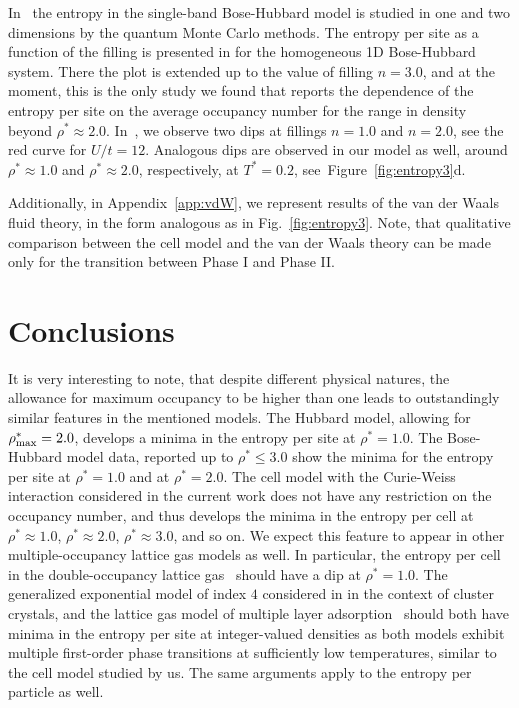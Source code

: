\documentclass[entropy,article,submit,pdftex,moreauthors]{Definitions/mdpi}
\begin{document}
In~\citep{PKvHT08} the entropy in the single-band Bose-Hubbard model is studied in one and two dimensions by the quantum Monte Carlo methods. The entropy per site as a function of the filling is presented in \citep[Fig.~2]{PKvHT08} for the homogeneous 1D Bose-Hubbard system. There the plot is extended up to the value of filling $n = 3.0$, and at the moment, this is the only study we found that reports the dependence of the entropy per site on the average occupancy number for the range in density beyond $\rho^* \approx 2.0$. In~\citep[Fig.~2]{PKvHT08}, we observe two dips at fillings $n = 1.0$ and $n = 2.0$, see the red curve for $U/t = 12$. Analogous dips are observed in our model as well, around $\rho^* \approx 1.0$ and $\rho^* \approx 2.0$, respectively, at $T^*=0.2$, see~Figure~\ref{fig:entropy3}d.

Additionally, in Appendix~\ref{app:vdW}, we represent results of the van der Waals fluid theory, in the form analogous as in Fig.~\ref{fig:entropy3}. Note, that qualitative comparison between the cell model and the van der Waals theory can be made only for the transition between Phase I and Phase II.


\section{Conclusions}

It is very interesting to note, that despite different physical natures, the allowance for maximum occupancy to be higher than one leads to outstandingly similar features in the mentioned models. The Hubbard model, allowing for $\rho^*_{\rm max} = 2.0$, develops a minima in the entropy per site at $\rho^* = 1.0$. The Bose-Hubbard model data, reported up to $\rho^* \leq 3.0$ show the minima for the entropy per site at $\rho^*=1.0$ and at $\rho^* = 2.0$. The cell model with the Curie-Weiss interaction considered in the current work does not have any restriction on the occupancy number, and thus develops the minima in the entropy per cell at $\rho^* \approx 1.0$, $\rho^* \approx 2.0$, $\rho^* \approx 3.0$, and so on. We expect this feature to appear in other multiple-occupancy lattice gas models as well. In particular, the entropy per cell in the double-occupancy lattice gas~\citep{LYZ21} should have a dip at $\rho^* = 1.0$. The generalized exponential model of index $4$ considered in \citep{Prestipino14,PGT15} in the context of cluster crystals, and the lattice gas model of multiple layer adsorption~\citep{dOG78} should both have minima in the entropy per site at integer-valued densities as both models exhibit multiple first-order phase transitions at sufficiently low temperatures, similar to the cell model studied by us. The same arguments apply to the entropy per particle as well.
\end{document}
